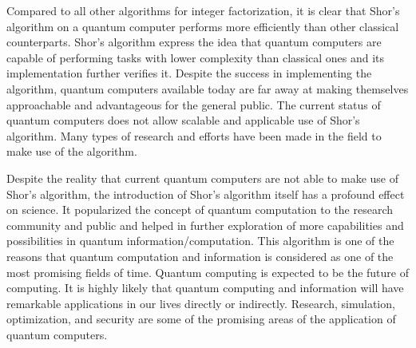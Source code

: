 Compared to all other algorithms for integer factorization, it is clear that Shor's algorithm on a quantum computer performs more efficiently than other classical counterparts. Shor's algorithm express the idea that quantum computers are capable of performing tasks with lower complexity than classical ones and its implementation further verifies it. Despite the success in implementing the algorithm, quantum computers available today are far away at making themselves approachable and advantageous for the general public. The current status of quantum computers does not allow scalable and applicable use of Shor's algorithm. Many types of research and efforts have been made in the field to make use of the algorithm. \par

Despite the reality that current quantum computers are not able to make use of  Shor's algorithm, the introduction of Shor's algorithm itself has a profound effect on science. It popularized the concept of quantum computation to the research community and public and helped in further exploration of more capabilities and possibilities in quantum information/computation. This algorithm is one of the reasons that quantum computation and information is considered as one of the most promising fields of time. Quantum computing is expected to be the future of computing. It is highly likely that quantum computing and information will have remarkable applications in our lives directly or indirectly. Research, simulation, optimization, and security are some of the promising areas of the application of quantum computers.\par